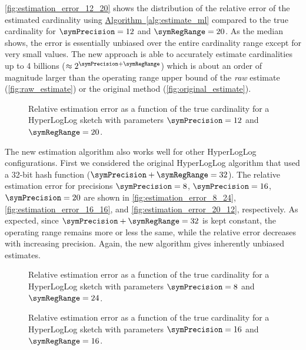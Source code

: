 \documentclass[a4paper]{scrartcl}
\newcommand*{\algoref}[1]{\hyperref[#1]{Algorithm~\ref*{#1}}}
\begin{document}
\autoref{fig:estimation_error_12_20} shows the distribution of the relative error of the estimated cardinality using \algoref{alg:estimate_ml} compared to the true cardinality for $\symPrecision=12$ and $\symRegRange=20$. As the median shows, the error is essentially unbiased over the entire cardinality range except for very small values. The new approach is able to accurately estimate cardinalities up to 4 billions ($\approx 2^{\symPrecision+\symRegRange}$) which is about an order of magnitude larger than the operating range upper bound of the \emph{raw} estimate (\autoref{fig:raw_estimate}) or the original method (\autoref{fig:original_estimate}).

\begin{figure}
\centering

\caption{Relative estimation error as a function of the true cardinality for a HyperLogLog sketch with parameters $\symPrecision = 12$ and $\symRegRange=20$.}
\label{fig:estimation_error_12_20}
\end{figure}

The new estimation algorithm also works well for other HyperLogLog configurations. First we considered the original HyperLogLog algorithm that used a 32-bit hash function ($\symPrecision + \symRegRange = 32$). The relative estimation error for precisions $\symPrecision=8$, $\symPrecision=16$, $\symPrecision=20$ are shown in \autoref{fig:estimation_error_8_24}, \autoref{fig:estimation_error_16_16}, and \autoref{fig:estimation_error_20_12}, respectively. As expected, since  $\symPrecision + \symRegRange = 32$ is kept constant, the operating range remains more or less the same, while the relative error decreases with increasing precision. Again, the new algorithm gives inherently unbiased estimates.

\begin{figure}
\centering

\caption{Relative estimation error as a function of the true cardinality for a HyperLogLog sketch with parameters $\symPrecision = 8$ and $\symRegRange=24$.}
\label{fig:estimation_error_8_24}
\end{figure}

\begin{figure}
\centering

\caption{Relative estimation error as a function of the true cardinality for a HyperLogLog sketch with parameters $\symPrecision = 16$ and $\symRegRange=16$.}
\label{fig:estimation_error_16_16}
\end{figure}
\end{document}
